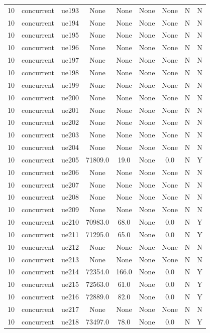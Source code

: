 \begin{table}[ht]
\begin{tabular}{|c|c|c|c|c|c|c|c|c|}
10 & concurrent & ue193 & None & None & None & None & N & N \\
10 & concurrent & ue194 & None & None & None & None & N & N \\
10 & concurrent & ue195 & None & None & None & None & N & N \\
10 & concurrent & ue196 & None & None & None & None & N & N \\
10 & concurrent & ue197 & None & None & None & None & N & N \\
10 & concurrent & ue198 & None & None & None & None & N & N \\
10 & concurrent & ue199 & None & None & None & None & N & N \\
10 & concurrent & ue200 & None & None & None & None & N & N \\
10 & concurrent & ue201 & None & None & None & None & N & N \\
10 & concurrent & ue202 & None & None & None & None & N & N \\
10 & concurrent & ue203 & None & None & None & None & N & N \\
10 & concurrent & ue204 & None & None & None & None & N & N \\
10 & concurrent & ue205 & 71809.0 & 19.0 & None & 0.0 & N & Y \\
10 & concurrent & ue206 & None & None & None & None & N & N \\
10 & concurrent & ue207 & None & None & None & None & N & N \\
10 & concurrent & ue208 & None & None & None & None & N & N \\
10 & concurrent & ue209 & None & None & None & None & N & N \\
10 & concurrent & ue210 & 70983.0 & 68.0 & None & 0.0 & N & Y \\
10 & concurrent & ue211 & 71295.0 & 65.0 & None & 0.0 & N & Y \\
10 & concurrent & ue212 & None & None & None & None & N & N \\
10 & concurrent & ue213 & None & None & None & None & N & N \\
10 & concurrent & ue214 & 72354.0 & 166.0 & None & 0.0 & N & Y \\
10 & concurrent & ue215 & 72563.0 & 61.0 & None & 0.0 & N & Y \\
10 & concurrent & ue216 & 72889.0 & 82.0 & None & 0.0 & N & Y \\
10 & concurrent & ue217 & None & None & None & None & N & N \\
10 & concurrent & ue218 & 73497.0 & 78.0 & None & 0.0 & N & Y \\

\end{tabular}
\end{table}
